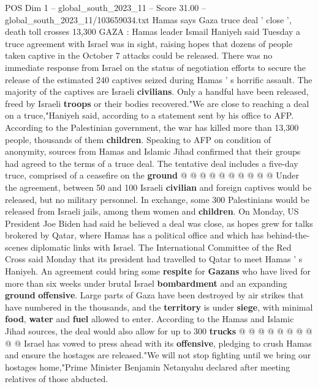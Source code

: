 \begin{textsample}{POS Dim 1 – global\_south\_2023\_11 – Score 31.00 – global\_south\_2023\_11/103659034.txt}  \label{ex:f1_pos_130}
Hamas says Gaza truce deal ' close ', death toll crosses 13,300 GAZA : Hamas leader Ismail Haniyeh said Tuesday a truce agreement with Israel was in sight, raising hopes that dozens of people taken captive in the October 7 attacks could be released.
There was no immediate response from Israel on the status of negotiation efforts to secure the release of the estimated 240 captives seized during Hamas ' s horrific assault.
The majority of the captives are Israeli \textbf{civilians}.
Only a handful have been released, freed by Israeli \textbf{troops} or their bodies recovered."We are close to reaching a deal on a truce,"Haniyeh said, according to a statement sent by his office to AFP.
According to the Palestinian government, the war has killed more than 13,300 people, thousands of them \textbf{children}.
Speaking to AFP on condition of anonymity, sources from Hamas and Islamic Jihad confirmed that their groups had agreed to the terms of a truce deal.
The tentative deal includes a five-day truce, comprised of a ceasefire on the \textbf{ground} @ @ @ @ @ @ @ @ @ @ Under the agreement, between 50 and 100 Israeli \textbf{civilian} and foreign captives would be released, but no military personnel.
In exchange, some 300 Palestinians would be released from Israeli jails, among them women and \textbf{children}.
On Monday, US President Joe Biden had said he believed a deal was close, as hopes grew for talks brokered by Qatar, where Hamas has a political office and which has behind-the-scenes diplomatic links with Israel.
The International Committee of the Red Cross said Monday that its president had travelled to Qatar to meet Hamas ' s Haniyeh.
An agreement could bring some \textbf{respite} for \textbf{Gazans} who have lived for more than six weeks under brutal Israel \textbf{bombardment} and an expanding \textbf{ground} \textbf{offensive}.
Large parts of Gaza have been destroyed by air strikes that have numbered in the thousands, and the \textbf{territory} is under \textbf{siege}, with minimal \textbf{food}, \textbf{water} and \textbf{fuel} allowed to enter.
According to the Hamas and Islamic Jihad sources, the deal would also allow for up to 300 \textbf{trucks} @ @ @ @ @ @ @ @ @ @ Israel has vowed to press ahead with its \textbf{offensive}, pledging to crush Hamas and ensure the hostages are released."We will not stop fighting until we bring our hostages home,"Prime Minister Benjamin Netanyahu declared after meeting relatives of those abducted.

\end{textsample}
